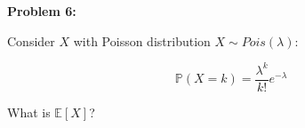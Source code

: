 \textbf{Problem 6:}

\singlespacing

Consider $X$ with Poisson distribution $X \sim Pois(\lambda)$:

\begin{equation}
    \mathbb{P}(X = k) =\frac{\lambda^k}{k!}e^{-\lambda}
\end{equation}

What is $\mathbb{E}[X]$?